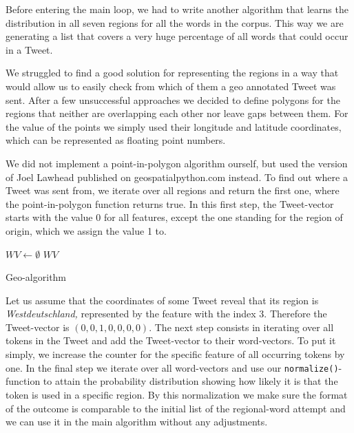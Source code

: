 \documentclass[../Main.tex]{subfiles}
\begin{document}
Before entering the main loop, we had to write another algorithm that learns the distribution in all seven regions for all the words in the corpus. This way we are generating a list that covers a very huge percentage of all words that could occur in a Tweet.

We struggled to find a good solution for representing the regions in a way that would allow us to easily check from which of them a geo annotated Tweet was sent. After a few unsuccessful approaches we decided to define polygons for the regions that neither are overlapping each other nor leave gaps between them. For the value of the points we simply used their longitude and latitude coordinates, which can be represented as floating point numbers.
  
We did not implement a point-in-polygon algorithm ourself, but used the version of Joel Lawhead published on geospatialpython.com \cite{GeoPy} instead.  
To find out where a Tweet was sent from, we iterate over all regions and return the first one, where the point-in-polygon function returns true.
In this first step, the Tweet-vector starts with the value 0 for all features, except the one standing for the region of origin, which we assign the value 1 to.

\begin{algorithm}[!b]
 \SetAlgoLined
 $WV \gets\emptyset $\; 
\Return $WV$\;
\label{geo-algo}
\caption{Geo-algorithm}
\end{algorithm}

Let us assume that the coordinates of some Tweet reveal that its region is \textit{Westdeutschland,} represented by the feature with the index $3$.
Therefore the Tweet-vector is $(0,0,1,0,0,0,0)$. 
The next step consists in iterating over all tokens in the Tweet and add the Tweet-vector to their word-vectors. To put it simply, we increase the counter for the specific feature of all occurring tokens by one. 
In the final step we iterate over all word-vectors and use our \texttt{normalize()}-function to attain the probability distribution showing how likely it is that the token is used in a specific region. By this normalization we make sure the format of the outcome is comparable to the initial list of the regional-word attempt and we can use it in the main algorithm without any adjustments.
\end{document}
